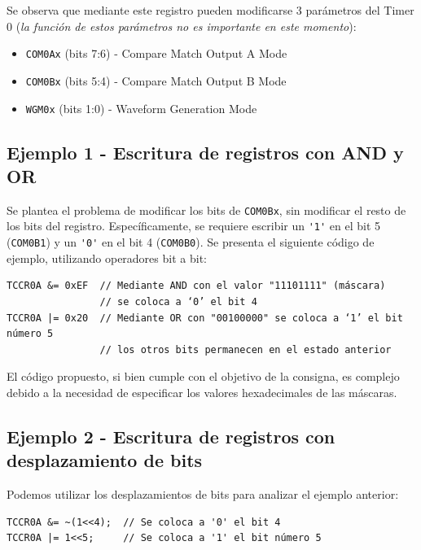 \documentclass[paper=a4, fontsize=11pt]{scrartcl}	%
\numberwithin{equation}{section} %
\numberwithin{figure}{section} %
\numberwithin{table}{section} %
\begin{document}
Se observa que mediante este registro pueden modificarse 3 parámetros
del Timer 0 (\emph{la función de estos parámetros no es importante en este
momento}):
\begin{itemize}
  \item \verb|COM0Ax| (bits 7:6) - Compare Match Output A Mode
  \item \verb|COM0Bx| (bits 5:4) - Compare Match Output B Mode
  \item \verb|WGM0x| (bits 1:0) - Waveform Generation Mode
\end{itemize}

\subsection{Ejemplo 1 - Escritura de registros con AND y OR}

Se plantea el problema de modificar los bits de \verb|COM0Bx|, sin
modificar el resto de los bits del registro. Específicamente, se
requiere escribir un \verb|'1'| en el bit 5 (\verb|COM0B1|) y un
\verb|'0'| en el bit 4 (\verb|COM0B0|).  Se presenta el siguiente código
de ejemplo, utilizando operadores {bit a bit}:

\begin{verbatim}
TCCR0A &= 0xEF  // Mediante AND con el valor "11101111" (máscara)
                // se coloca a ‘0’ el bit 4
TCCR0A |= 0x20  // Mediante OR con "00100000" se coloca a ‘1’ el bit número 5
                // los otros bits permanecen en el estado anterior
\end{verbatim}

El código propuesto, si bien cumple con el objetivo de la consigna, es
complejo debido a la necesidad de especificar los valores hexadecimales de
las máscaras.

\subsection{Ejemplo 2 - Escritura de registros con desplazamiento de bits}

Podemos utilizar los desplazamientos de bits para analizar el ejemplo
anterior:

\begin{verbatim}
TCCR0A &= ~(1<<4);  // Se coloca a '0' el bit 4
TCCR0A |= 1<<5;     // Se coloca a '1' el bit número 5
\end{verbatim}
\end{document}
